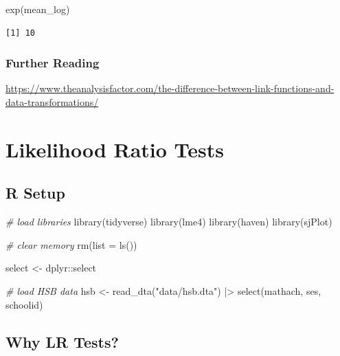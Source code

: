 \documentclass[
  letterpaper,
  DIV=11,
  numbers=noendperiod]{scrreprt}
\newenvironment{Shaded}{}{}
\newcommand{\AttributeTok}[1]{\textcolor[rgb]{0.49,0.56,0.16}{#1}}
\newcommand{\CommentTok}[1]{\textcolor[rgb]{0.38,0.63,0.69}{\textit{#1}}}
\newcommand{\FunctionTok}[1]{\textcolor[rgb]{0.02,0.16,0.49}{#1}}
\newcommand{\NormalTok}[1]{#1}
\newcommand{\OtherTok}[1]{\textcolor[rgb]{0.00,0.44,0.13}{#1}}
\newcommand{\SpecialCharTok}[1]{\textcolor[rgb]{0.25,0.44,0.63}{#1}}
\newcommand{\StringTok}[1]{\textcolor[rgb]{0.25,0.44,0.63}{#1}}
\begin{document}
\begin{Shaded}
\begin{Highlighting}[]
\FunctionTok{exp}\NormalTok{(mean\_log)}
\end{Highlighting}
\end{Shaded}

\begin{verbatim}
[1] 10
\end{verbatim}

\subsection{Further Reading}\label{further-reading-2}

\url{https://www.theanalysisfactor.com/the-difference-between-link-functions-and-data-transformations/}

\chapter{Likelihood Ratio Tests}\label{likelihood-ratio-tests}

\section{R Setup}\label{r-setup-1}

\begin{Shaded}
\begin{Highlighting}[]
\CommentTok{\# load libraries}
\FunctionTok{library}\NormalTok{(tidyverse)}
\FunctionTok{library}\NormalTok{(lme4)}
\FunctionTok{library}\NormalTok{(haven)}
\FunctionTok{library}\NormalTok{(sjPlot)}

\CommentTok{\# clear memory}
\FunctionTok{rm}\NormalTok{(}\AttributeTok{list =} \FunctionTok{ls}\NormalTok{())}

\NormalTok{select }\OtherTok{\textless{}{-}}\NormalTok{ dplyr}\SpecialCharTok{::}\NormalTok{select}

\CommentTok{\# load HSB data}
\NormalTok{hsb }\OtherTok{\textless{}{-}} \FunctionTok{read\_dta}\NormalTok{(}\StringTok{"data/hsb.dta"}\NormalTok{) }\SpecialCharTok{|\textgreater{}} 
  \FunctionTok{select}\NormalTok{(mathach, ses, schoolid)}
\end{Highlighting}
\end{Shaded}

\section{Why LR Tests?}\label{why-lr-tests}
\end{document}
